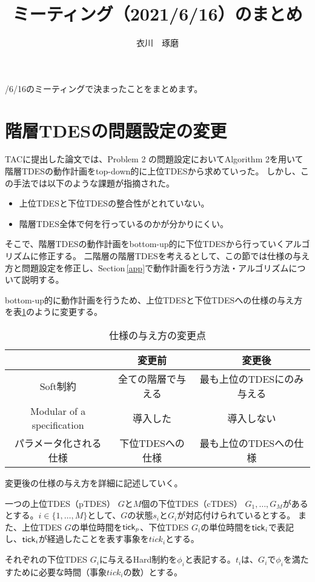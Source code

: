 \documentclass[ 10pt]{jsarticle}
\title{ミーティング（2021/6/16）のまとめ}
\author{衣川　琢磨}
\newcommand{\rsec}[1]{Section\,\ref{#1}}
\newcommand{\tick}{{\sf tick}}
\begin{document}
/6/16のミーティングで決まったことをまとめます。

\section{階層TDESの問題設定の変更}
TACに提出した論文では、Problem 2 の問題設定においてAlgorithm 2を用いて階層TDESの動作計画をtop-down的に上位TDESから求めていった。
しかし、この手法では以下のような課題が指摘された。
\begin{itemize}
\item
上位TDESと下位TDESの整合性がとれていない。
\item
階層TDES全体で何を行っているのかが分かりにくい。
\end{itemize}
そこで、階層TDESの動作計画をbottom-up的に下位TDESから行っていくアルゴリズムに修正する。
二階層の階層TDESを考えるとして、この節では仕様の与え方と問題設定を修正し、\rsec{app}で動作計画を行う方法・アルゴリズムについて説明する。

bottom-up的に動作計画を行うため、上位TDESと下位TDESへの仕様の与え方を表\ref{spec}のように変更する。
%
\begin{table}[htb]
\centering
\caption{仕様の与え方の変更点}
\label{spec}
\begin{tabular}{c||c|c}
 &変更前　&　変更後　\\\hline\hline
Soft制約&全ての階層で与える&最も上位のTDESにのみ与える\\\hline
Modular of a specification&導入した&導入しない\\\hline
パラメータ化される仕様 &下位TDESへの仕様&最も上位のTDESへの仕様
\end{tabular}
\end{table}
%

変更後の仕様の与え方を詳細に記述していく。

一つの上位TDES（pTDES） $G$と$M$個の下位TDES（cTDES） $G_1,\ldots,G_M$があるとする。$i\in\{1,\ldots,M\}$として、$G$の状態$s_i$と$G_i$が対応付けられているとする。
また、上位TDES $G$の単位時間を$\tick_p$、下位TDES $G_i$の単位時間を$\tick_i$で表記し、$\tick_i$が経過したことを表す事象を$\textit{tick}_i$とする。

それぞれの下位TDES $G_i$に与えるHard制約を$\phi_i$と表記する。$t_i$は、$G_i$で$\phi_i$を満たすために必要な時間（事象$\textit{tick}_i$の数）とする。
\end{document}
